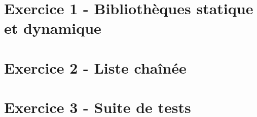 \documentclass[12pt,a4paper]{article}
\begin{document}
\section{Exercice 1 - Bibliothèques statique et dynamique}

\vspace*{0.7cm}



\newpage

\section{Exercice 2 - Liste chaînée}

\vspace*{0.7cm}



\newpage

\section{Exercice 3 - Suite de tests}

\vspace*{0.7cm}


\end{document}
